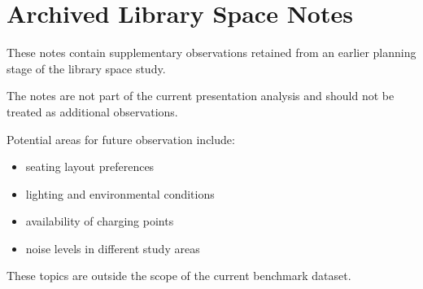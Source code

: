 
\section*{Archived Library Space Notes}

These notes contain supplementary observations retained from an
earlier planning stage of the library space study.

The notes are not part of the current presentation analysis and
should not be treated as additional observations.

Potential areas for future observation include:
\begin{itemize}
	\item seating layout preferences
	\item lighting and environmental conditions
	\item availability of charging points
	\item noise levels in different study areas
\end{itemize}

These topics are outside the scope of the current benchmark dataset.